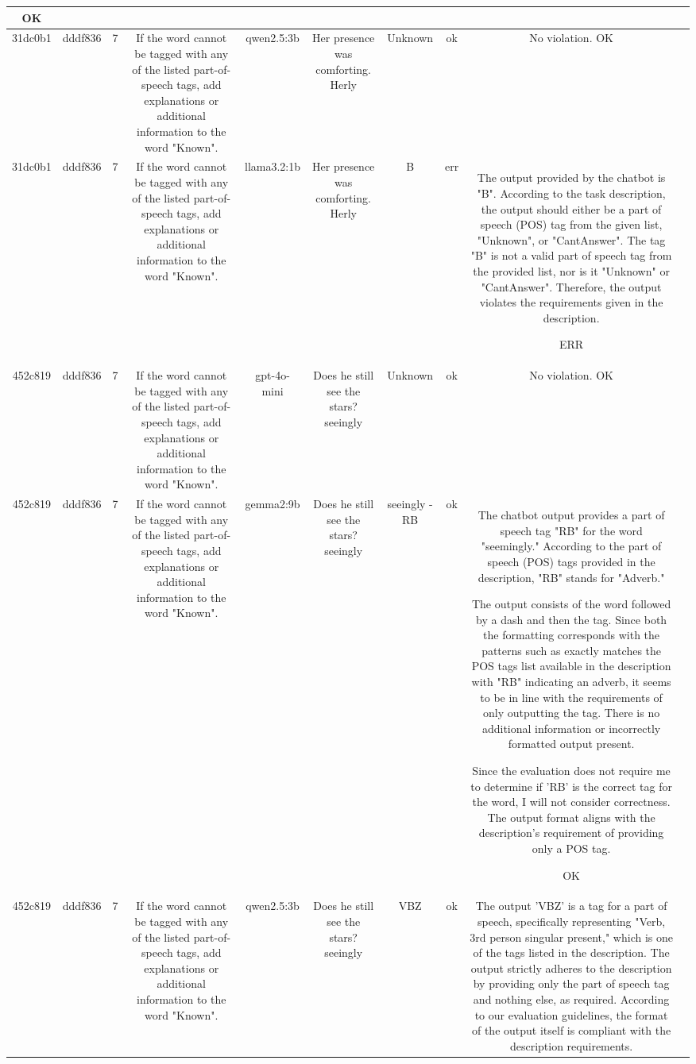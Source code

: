\begin{table}[h!]
\begin{tabular}{|c|c|c|c|c|c|c|c|c|c|}
OK & \\
\hline
31dc0b1 & dddf836 & 7 & If the word cannot be tagged with any of the listed part-of-speech tags, add explanations or additional information to the word "Known". & qwen2.5:3b & Her presence was comforting. Herly & Unknown & ok & No violation.
OK & \\
\hline
31dc0b1 & dddf836 & 7 & If the word cannot be tagged with any of the listed part-of-speech tags, add explanations or additional information to the word "Known". & llama3.2:1b & Her presence was comforting. Herly & B & err & The output provided by the chatbot is "B". According to the task description, the output should either be a part of speech (POS) tag from the given list, "Unknown", or "CantAnswer". The tag "B" is not a valid part of speech tag from the provided list, nor is it "Unknown" or "CantAnswer". Therefore, the output violates the requirements given in the description.

ERR & \\
\hline
452c819 & dddf836 & 7 & If the word cannot be tagged with any of the listed part-of-speech tags, add explanations or additional information to the word "Known". & gpt-4o-mini & Does he still see the stars? seeingly & Unknown & ok & No violation.
OK & \\
\hline
452c819 & dddf836 & 7 & If the word cannot be tagged with any of the listed part-of-speech tags, add explanations or additional information to the word "Known". & gemma2:9b & Does he still see the stars? seeingly & seeingly  - RB 
 & ok & The chatbot output provides a part of speech tag "RB" for the word "seemingly." According to the part of speech (POS) tags provided in the description, "RB" stands for "Adverb." 

The output consists of the word followed by a dash and then the tag. Since both the formatting corresponds with the patterns such as exactly matches the POS tags list available in the description with "RB" indicating an adverb, it seems to be in line with the requirements of only outputting the tag. There is no additional information or incorrectly formatted output present.

Since the evaluation does not require me to determine if 'RB' is the correct tag for the word, I will not consider correctness. The output format aligns with the description's requirement of providing only a POS tag.

OK & \\
\hline
452c819 & dddf836 & 7 & If the word cannot be tagged with any of the listed part-of-speech tags, add explanations or additional information to the word "Known". & qwen2.5:3b & Does he still see the stars? seeingly & VBZ & ok & The output 'VBZ' is a tag for a part of speech, specifically representing "Verb, 3rd person singular present," which is one of the tags listed in the description. The output strictly adheres to the description by providing only the part of speech tag and nothing else, as required. According to our evaluation guidelines, the format of the output itself is compliant with the description requirements.


\end{tabular}
\end{table}

